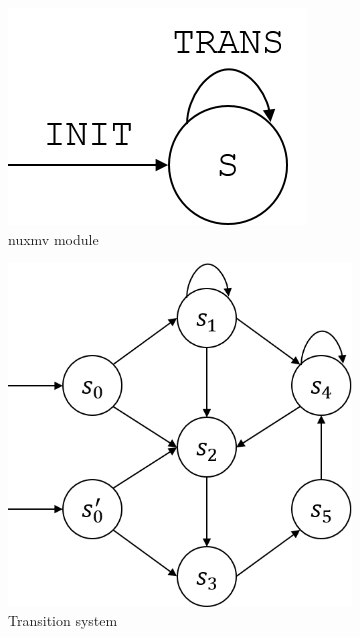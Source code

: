 \begin{figure}
    \def\subfigw{0.5\textwidth}
    \def\figscale{0.4}
    \begin{subfigure}[b]{\subfigw}
        \centering
        \includegraphics[scale=\figscale]{figures/module.png}
        \caption{\gls{nuxmv} module}
    \end{subfigure}
    \begin{subfigure}[b]{\subfigw}
        \centering
        \includegraphics[scale=\figscale]{figures/transition-system.png}
        \caption{Transition system}
    \end{subfigure}
    \begin{subfigure}[b]{\subfigw}
        \centering

\end{subfigure}
\end{figure}
